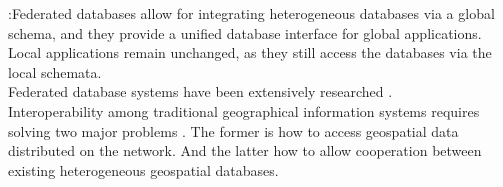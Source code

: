 \documentclass[12pt,a4paper]{report}
\begin{document}
	\citep{Butenuth}:Federated databases allow for integrating heterogeneous databases via a global schema, and they provide a unified database interface for global applications. Local applications remain unchanged, as they still access the databases via the local schemata.
	\\

	Federated database systems have been extensively researched \citep{Litwin, Sheth}.
	\\

	Interoperability among traditional geographical information systems requires solving two major problems \citep{Gong}. The former is how to access geospatial data distributed on the network. And the latter how to allow cooperation between existing heterogeneous geospatial databases.
	\\

	\renewcommand{\bibname}{References}
	
	
\end{document}
